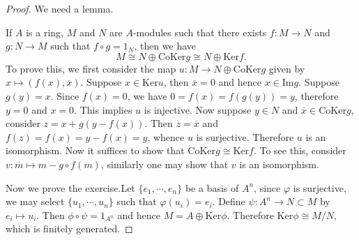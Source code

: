 \begin{proof}
We need a lemma.\par
If $A$ is a ring, $M$ and $N$ are $A$-modules such that there exists $f:M\to N$ and $g:N\to M$ such that $f\circ g=1_N$, then we have 
$$
M\cong N\oplus \mathrm{CoKer}g\cong N\oplus \mathrm{Ker}f.
$$
To prove this, we first consider the map $u:M\to N\oplus\mathrm{CoKer}g$ given by $x\mapsto(f(x),\overline{x})$. Suppose $x\in\mathrm{Ker}u$, then $\overline{x}=0$ and hence $x\in\mathrm{Im}g$. Suppose $g(y)=x$. Since $f(x)=0$, we have $0=f(x)=f(g(y))=y$, therefore $y=0$ and $x=0$. This implies $u$ is injective. Now suppose $y\in N$ and $\overline{x}\in\mathrm{CoKer}g$, consider $z=x+g(y-f(x))$. Then $\overline{z}=\overline{x}$ and $f(z)=f(x)=y-f(x)=y$, whence $u$ is surjective. Therefore $u$ is an isomorphism. Now it suffices to show that $\mathrm{CoKer}g\cong\mathrm{Ker}f$. To see this, consider $v:\overline{m}\mapsto m-g\circ f(m)$, similarly one may show that $v$ is an isomorphism.\par
Now we prove the exercise.Let $\{e_1,\cdots,e_n\}$ be a basis of $A^n$, since $\varphi$ is surjective, we may select $\{u_1,\cdots,u_n\}$ such that $\varphi(u_i)=e_i$. Define $\psi:A^n\to N\subset M$ by $e_i\mapsto u_i$. Then $\phi\circ\psi=1_{A^n}$ and hence $M=A\oplus\mathrm{Ker}\phi$. Therefore $\mathrm{Ker}\phi\cong M/N$, which is finitely generated.
\end{proof}